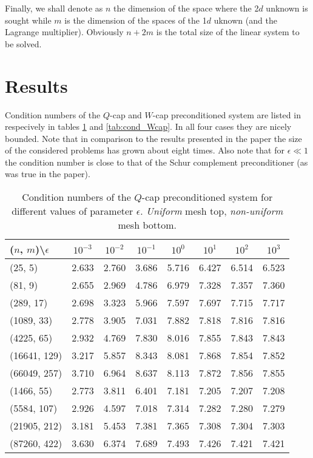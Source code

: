 \documentclass[10pt, a4paper]{article}
\begin{document}
Finally, we shall denote as $n$ the dimension of the space where the 2$d$ unknown 
is sought while $m$ is the dimension of the spaces of the 1$d$ uknown (and the 
Lagrange multiplier). Obviously $n+2m$ is the total size of the linear system to 
be solved.

\section*{Results}
Condition numbers of the $Q$-cap and $W$-cap preconditioned system are listed in
respecively in tables \ref{tab:cond_Qcap} and \ref{tab:cond_Wcap}. In all four 
cases they are nicely bounded. Note that in comparison to the results presented 
in the paper the size of the considered problems has grown about eight times. Also 
note that for $\epsilon \ll 1$ the condition number is close to that of the Schur 
complement preconditioner (as was true in the paper).
\begin{table}[ht]
  \caption{Condition numbers of the $Q$-cap preconditioned system for different 
  values of parameter $\epsilon$. \textit{Uniform} mesh top, \textit{non-uniform} 
  mesh bottom.
}
\label{tab:cond_Qcap}
\footnotesize{
\begin{tabular}{l|ccccccc}
\hline
($n$, $m$)\textbackslash $\epsilon$ & $10^{-3}$ & $10^{-2}$ & $10^{-1}$ & $10^{0}$ & $10^{1}$ & $10^{2}$ & $10^{3}$\\
\hline
(25, 5) & 2.633 & 2.760 & 3.686 & 5.716 & 6.427 & 6.514 & 6.523\\
(81, 9) & 2.655 & 2.969 & 4.786 & 6.979 & 7.328 & 7.357 & 7.360\\
(289, 17) & 2.698 & 3.323 & 5.966 & 7.597 & 7.697 & 7.715 & 7.717\\
(1089, 33) & 2.778 & 3.905 & 7.031 & 7.882 & 7.818 & 7.816 & 7.816\\
(4225, 65) & 2.932 & 4.769 & 7.830 & 8.016 & 7.855 & 7.843 & 7.843\\
(16641, 129) & 3.217 & 5.857 & 8.343 & 8.081 & 7.868 & 7.854 & 7.852\\
(66049, 257) & 3.710 & 6.964 & 8.637 & 8.113 & 7.872 & 7.856 & 7.855\\
\hline
\hline
(1466, 55) & 2.773 & 3.811 & 6.401 & 7.181 & 7.205 & 7.207 & 7.208\\
(5584, 107) & 2.926 & 4.597 & 7.018 & 7.314 & 7.282 & 7.280 & 7.279\\
(21905, 212) & 3.181 & 5.453 & 7.381 & 7.365 & 7.308 & 7.304 & 7.303\\
(87260, 422) & 3.630 & 6.374 & 7.689 & 7.493 & 7.426 & 7.421 & 7.421\\
\hline
\end{tabular}
}
\end{table}
\end{document}
